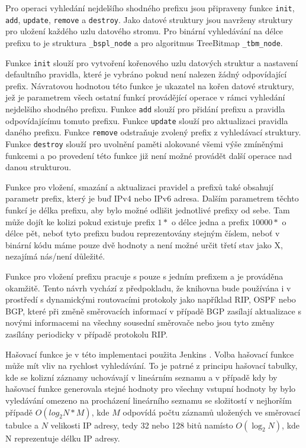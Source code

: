 Pro operaci vyhledání nejdelšího shodného prefixu jsou připraveny funkce
\texttt{init}, \texttt{add}, \texttt{update}, \texttt{remove} a \texttt{destroy}.
Jako datové struktury jsou navrženy struktury pro uložení každého uzlu datového stromu.
Pro binární vyhledávání na délce prefixu to je struktura \texttt{\_bspl\_node} a pro
algoritmus TreeBitmap \texttt{\_tbm\_node}.

Funkce \texttt{init} slouží pro vytvoření kořenového uzlu datových struktur a
nastavení defaultního pravidla, které je vybráno pokud není nalezen žádný odpovídající prefix.
Návratovou hodnotou této funkce je ukazatel na kořen datové struktury, jež je parametrem
všech ostatní funkcí provádějící operace v rámci vyhledání nejdelšiho shodného prefixu.
Funkce \texttt{add} slouží pro přidání prefixu a pravidla odpovídajícímu tomuto prefixu.
Funkce \texttt{update} slouží pro aktualizaci pravidla daného prefixu.
Funkce \texttt{remove} odstraňuje zvolený prefix z vyhledávací struktury.
Funkce \texttt{destroy} slouží pro uvolnění paměti alokované všemi výše zmíněnými funkcemi
a po provedení této funkce již není možné provádět další operace nad danou strukturou.

Funkce pro vložení, smazání a aktualizaci pravidel a prefixů také obsahují parametr
prefix, který je buď IPv4 nebo IPv6 adresa. Dalším parametrem těchto funkcí je délka prefixu,
aby bylo možné odlišit jednotlivé prefixy od sebe. Tam může dojít ke kolizi pokud existuje
prefix $1*$ o délce jedna a prefix $10000*$ o délce pět, neboť tyto prefixu budou reprezentovány stejným
číslem, neboť v binární kódu máme pouze dvě hodnoty a není možné určit třetí stav jako X,
nezajímá nás/není důležité.

Funkce pro vložení prefixu pracuje s pouze s jedním prefixem a je prováděna okamžitě.
Tento návrh vychází z předpokladu, že knihovna bude používána i v prostředí s dynamickými routovacími
protokoly jako například RIP, OSPF nebo BGP, které při změně směrovacích informací v případě BGP
zasílají aktualizace s novými informacemi na všechny sousední směrovače nebo jsou tyto změny
zasílány periodicky v případě protokolu RIP.

Hašovací funkce je v této implementaci použita Jenkins \cite{jenkins}. Volba hašovací funkce
může mít vliv na rychlost vyhledávání. To je patrné z principu hašovací tabulky, kde se
kolizní záznamy uchovávají v lineárním seznamu a v případě kdy by hašovací funkce generovala
stejné hodnoty pro všechny vstupní hodnoty by bylo vyledávání omezeno na procházení
lineárního seznamu se složitostí v nejhorším případě $O(log_2{N}*M)$, kde $M$ odpovídá počtu záznamů uložených ve směrovací tabulce a $N$ velikosti IP adresy, tedy 32 nebo 128 bitů
namísto $O(\log_2{N})$, kde N reprezentuje délku IP adresy.

